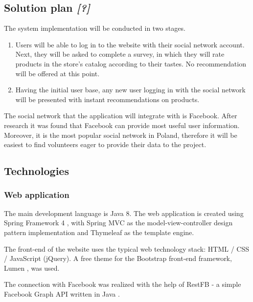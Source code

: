 \documentclass[12pt]{report}
\begin{document}
\subsection{Solution plan \textit{[?]}}

The system implementation will be conducted in two stages.
\begin{enumerate}
\item Users will be able to log in to the website with their social network account. Next, they will be asked to complete a survey, in which they will rate products in the store's catalog according to their tastes. No recommendation will be offered at this point.
\item Having the initial user base, any new user logging in with the social network will be presented with instant recommendations on products.
\end{enumerate}

The social network that the application will integrate with is Facebook. After research it was found that Facebook can provide most useful user information. Moreover, it is the most popular social network in Poland, therefore it will be easiest to find volunteers eager to provide their data to the project.

\subsection{Technologies}
\subsubsection{Web application}
The main development language is Java 8. The web application is created using Spring Framework 4 \cite{spring_framework}, with Spring MVC as the model-view-controller design pattern implementation and Thymeleaf as the template engine. 

The front-end of the website uses the typical web technology stack: HTML / CSS / JavaScript (jQuery). A free theme for the Bootstrap front-end framework, Lumen \cite{lumen}, was used.

The connection with Facebook was realized with the help of RestFB - a simple Facebook Graph API written in Java \cite{restfb}.

\end{document}
